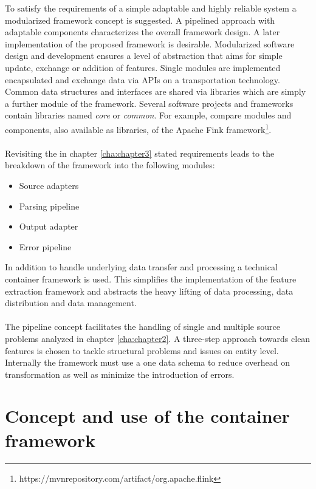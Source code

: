To satisfy the requirements of a simple adaptable and highly reliable system a modularized framework concept is suggested. A pipelined approach with adaptable components characterizes the overall framework design. A later implementation of the proposed framework is desirable. Modularized software design and development ensures a level of abstraction that aims for simple update, exchange or addition of features. Single modules are implemented encapsulated and exchange data via APIs on a transportation technology. Common data structures and interfaces are shared via libraries which are simply a further module of the framework. Several software projects and frameworks contain libraries named \textit{core} or \textit{common}. For example, compare modules and components, also available as libraries, of the Apache Fink framework\footnote{https://mvnrepository.com/artifact/org.apache.flink}.
\\\\
Revisiting the in chapter \ref{cha:chapter3} stated requirements leads to the breakdown of the framework into the following modules:
\begin{itemize}
\item Source adapters
\item Parsing pipeline
\item Output adapter
\item Error pipeline
\end{itemize}
In addition to handle underlying data transfer and processing a technical container framework is used. This simplifies the implementation of the feature extraction framework and abstracts the heavy lifting of data processing, data distribution and data management.
\\\\
The pipeline concept facilitates the handling of single and multiple source problems analyzed in chapter \ref{cha:chapter2}. A three-step approach towards clean features is chosen to tackle structural problems and issues on entity level. Internally the framework must use a one data schema to reduce overhead on transformation as well as minimize the introduction of errors.

\section{Concept and use of the container framework \label{sec:containerframework}}

